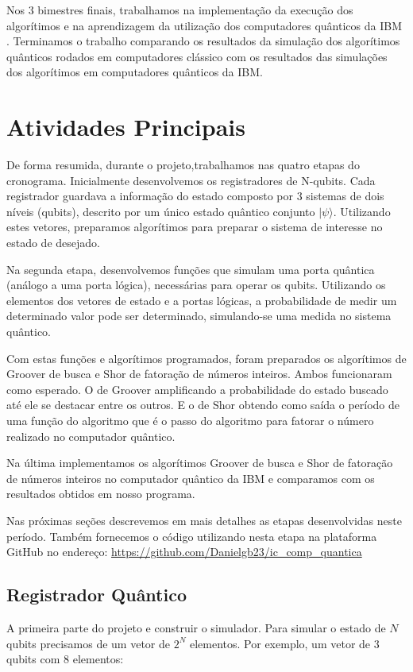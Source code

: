 \documentclass[12pt,a4paper]{article}
\begin{document}
Nos 3 bimestres finais, trabalhamos na implementação da execução dos algorítimos e na aprendizagem da utilização dos computadores quânticos da IBM \cite{IBM2019IBMExperience}. Terminamos o trabalho comparando os resultados da simulação dos algorítimos quânticos rodados em computadores clássico com os resultados das simulações dos algorítimos em computadores quânticos da IBM. 



\section{Atividades Principais}

De forma resumida, durante o projeto,trabalhamos nas quatro etapas do cronograma. Inicialmente desenvolvemos os registradores de N-qubits. Cada registrador guardava a informação do estado composto por 3 sistemas de dois níveis (qubits), descrito por um único estado quântico conjunto $|\psi\rangle$.  Utilizando estes vetores, preparamos algorítimos para preparar o sistema de interesse no estado de desejado. 

Na segunda etapa, desenvolvemos funções que simulam uma porta quântica (análogo a uma porta lógica), necessárias para operar os qubits. Utilizando os elementos dos vetores de estado e a portas lógicas, a probabilidade de medir um determinado valor pode ser determinado, simulando-se uma medida no sistema quântico. 

Com estas funções e algorítimos programados, foram preparados os algorítimos de Groover de busca e Shor de fatoração de números inteiros. Ambos funcionaram como esperado. O de Groover amplificando a probabilidade do estado buscado até ele se destacar entre os outros. E o de Shor obtendo como saída o período de uma função do algoritmo que é o passo do algoritmo para fatorar o número realizado no computador quântico.

Na última implementamos os algorítimos Groover de busca e Shor de fatoração de números inteiros no computador quântico da IBM e comparamos com os resultados obtidos em nosso programa.

Nas próximas seções descrevemos em mais detalhes as etapas desenvolvidas neste período. Também fornecemos o código utilizando nesta etapa na plataforma GitHub no endereço: \url{https://github.com/Danielgb23/ic_comp_quantica}

\subsection{Registrador Quântico}
A primeira parte do projeto e construir o simulador. Para simular o estado de $N$ qubits precisamos de um vetor de  $2^{N}$ elementos.
Por exemplo, um vetor de 3 qubits com 8 elementos:
\end{document}

